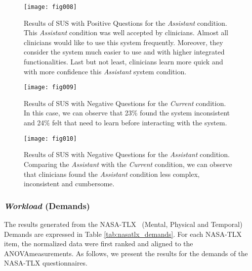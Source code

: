 \begin{figure}[htbp]
\centering
\texttt{[image: fig008]}
\caption{Results of SUS with Positive Questions for the {\it Assistant} condition. This {\it Assistant} condition was well accepted by clinicians. Almost all clinicians would like to use this system frequently. Moreover, they consider the system much easier to use and with higher integrated functionalities. Last but not least, clinicians learn more quick and with more confidence this {\it Assistant} system condition.}
\label{fig:fig008}
\end{figure}

\begin{figure}[htbp]
\centering
\texttt{[image: fig009]}
\caption{Results of SUS with Negative Questions for the {\it Current} condition. In this case, we can observe that 23\% found the system inconsistent and 24\% felt that need to learn before interacting with the system.}
\label{fig:fig009}
\end{figure}

\begin{figure}[htbp]
\centering
\texttt{[image: fig010]}
\caption{Results of SUS with Negative Questions for the {\it Assistant} condition. Comparing the {\it Assistant} with the {\it Current} condition, we can observe that clinicians found the {\it Assistant} condition less complex, inconsistent and cumbersome.}
\label{fig:fig010}
\end{figure}

\clearpage

\subsubsection{{\it Workload} (Demands)}

The results generated from the NASA-TLX~\cite{grier2015high, ramkumar2017using} (Mental, Physical and Temporal) Demands are expressed in Table \ref{tab:nasatlx_demands}.
For each NASA-TLX item, the normalized data were first ranked and aligned to the ANOVA\footnotemark[12] measurements.
As follows, we present the results for the demands of the NASA-TLX questionnaires.

